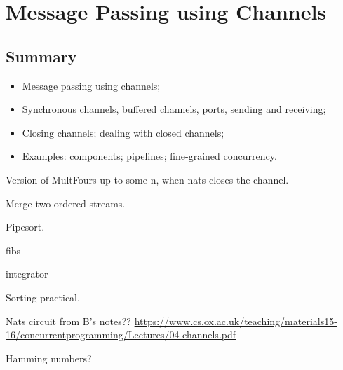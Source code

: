 \chapter{Message Passing using Channels} 


%




\section{Summary}

\begin{itemize}
\item 
Message passing using channels;

\item
Synchronous channels, buffered channels, ports, sending and receiving;

\item
Closing channels; dealing with closed channels;

\item
Examples: components; pipelines; fine-grained concurrency.
\end{itemize}



\exercises

Version of MultFours up to some n, when nats closes the channel.

Merge two ordered streams.

Pipesort.

fibs

integrator

Sorting practical.

Nats circuit from B's notes?? 
\url{https://www.cs.ox.ac.uk/teaching/materials15-16/concurrentprogramming/Lectures/04-channels.pdf}

Hamming numbers?
